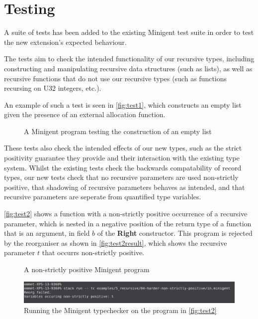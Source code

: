 \section{Testing}

A suite of tests has been added to the existing Minigent test suite in order to test the new extension's 
expected behaviour.

The tests aim to check the intended functionality of our recursive types, including constructing and manipulating
recursive data structures (such as lists), as well as recursive functions that do not use our recursive types 
(such as functions recursing on U32 integers, etc.).

An example of such a test is seen in \autoref{fig:test1}, which constructs an empty list given the presence
of an external allocation function.

\begin{figure}
    \centering
    
    \caption{A Minigent program testing the construction of an empty list}
    \label{fig:test1}
\end{figure}

These tests also check the intended effects of our new types, such as the strict positivity guarantee they provide
and their interaction with the existing type system. Whilst the existing tests check the backwards compatability of
record types, our new tests check that no recursive parameters are used non-strictly positive, that shadowing of recursive
parameters behaves as intended, and that recursive parameters are seperate from quantified type variables.

\autoref{fig:test2} shows a function with a non-strictly positive occurrence of a recursive parameter, which is nested in 
a negative position of the return type of a function that is an argument, in field $b$ of the \textbf{Right} constructor.
This program is rejected by the reorganiser
as shown in \autoref{fig:test2result}, which shows the recursive parameter $t$ that occurrs non-strictly positive.

\begin{figure}
    \centering
    
    \caption{A non-strictly positive Minigent program}
    \label{fig:test2}
\end{figure}

\begin{figure}
    \centering
    \includegraphics[width=\linewidth]{content/test2result.png}
    \caption{Running the Minigent typechecker on the program in \autoref{fig:test2}}
    \label{fig:test2result}
\end{figure}

